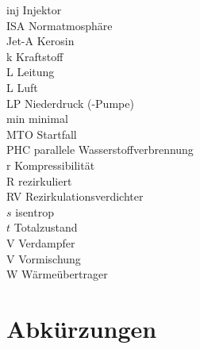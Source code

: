 \begin{tabbing}
    inj     \>  Injektor                                            \\
    ISA     \>  Normatmosphäre                                      \\
    Jet-A   \>  Kerosin                                             \\
    k       \>  Kraftstoff                                          \\
    L       \>  Leitung                                             \\
    L       \>  Luft                                                \\
    LP      \>  Niederdruck (-Pumpe)                                \\
    min 	\> 	minimal 											\\
    MTO     \>  Startfall                                           \\
    PHC     \>  parallele Wasserstoffverbrennung                    \\
    r       \>  Kompressibilität                                    \\
    R       \>  rezirkuliert                                        \\
    RV      \>  Rezirkulationsverdichter                            \\
    $s$     \>  isentrop                                            \\
    $t$     \>  Totalzustand                                        \\
    V       \>  Verdampfer                                          \\
    V       \>  Vormischung                                         \\
    W       \>  Wärmeübertrager                                     \\

\end{tabbing}

\section*{Abkürzungen}


